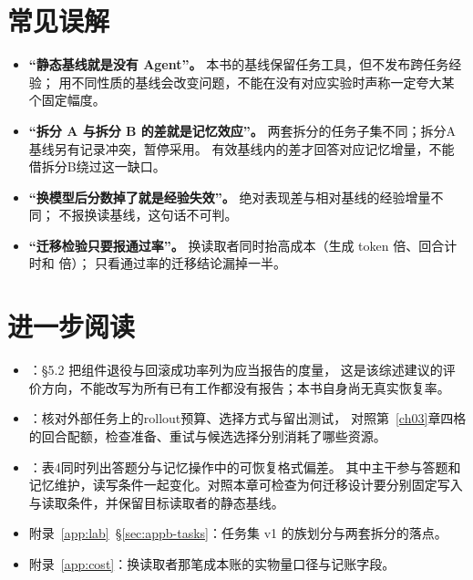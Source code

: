 \section*{常见误解}
\begin{itemize}
  \item \textbf{“静态基线就是没有 Agent”。}
        本书的基线保留任务工具，但不发布跨任务经验；
        用不同性质的基线会改变问题，不能在没有对应实验时声称一定夸大某个固定幅度。
  \item \textbf{“拆分 A 与拆分 B 的差就是记忆效应”。}
        两套拆分的任务子集不同；拆分A基线另有记录冲突，暂停采用。
        有效基线内的差才回答对应记忆增量，不能借拆分B绕过这一缺口。
  \item \textbf{“换模型后分数掉了就是经验失效”。}
        绝对表现差与相对基线的经验增量不同；
        不报换读基线，这句话不可判。
  \item \textbf{“迁移检验只要报通过率”。}
        换读取者同时抬高成本（生成 token  倍、回合计时和  倍）；
        只看通过率的迁移结论漏掉一半。
\end{itemize}

\section*{进一步阅读}
\begin{itemize}
  \item \cite{coding-survey-2608}：§5.2 把组件退役与回滚成功率列为应当报告的度量，
        这是该综述建议的评价方向，不能改写为所有已有工作都没有报告；本书自身尚无真实恢复率。
  \item \cite{harness-eval-2607}：核对外部任务上的rollout预算、选择方式与留出测试，
        对照第~\ref{ch03}章四格的回合配额，检查准备、重试与候选选择分别消耗了哪些资源。
  \item \cite{anatomy-memory-2602}：表4同时列出答题分与记忆操作中的可恢复格式偏差。
        其中主干参与答题和记忆维护，读写条件一起变化。对照本章可检查为何迁移设计要分别固定写入与读取条件，并保留目标读取者的静态基线。
  \item 附录~\ref{app:lab}~\S\ref{sec:appb-tasks}：任务集 v1 的族划分与两套拆分的落点。
  \item 附录~\ref{app:cost}：换读取者那笔成本账的实物量口径与记账字段。
\end{itemize}
